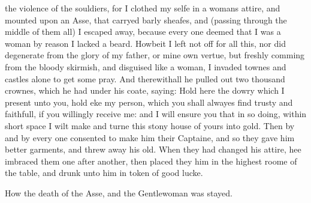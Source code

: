 the violence of the souldiers, for I clothed my selfe in a womans attire, and
mounted upon an Asse, that carryed barly sheafes, and (passing through the
middle of them all) I escaped away, because every one deemed that I was a woman
by reason I lacked a beard. Howbeit I left not off for all this, nor did
degenerate from the glory of my father, or mine own vertue, but freshly comming
from the bloody skirmish, and disguised like a woman, I invaded townes and
castles alone to get some pray. And therewithall he pulled out two thousand
crownes, which he had under his coate, saying: Hold here the dowry which I
present unto you, hold eke my person, which you shall alwayes find trusty and
faithfull, if you willingly receive me: and I will ensure you that in so doing,
within short space I wilt make and turne this stony house of yours into gold.
Then by and by every one consented to make him their Captaine, and so they gave
him better garments, and threw away his old. When they had changed his attire,
hee imbraced them one after another, then placed they him in the highest roome
of the table, and drunk unto him in token of good lucke.


How the death of the Asse, and the Gentlewoman was stayed.

